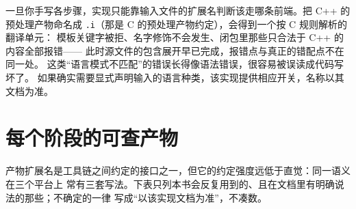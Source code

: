 \documentclass[12pt,a4paper,fontset=fandol]{ctexbook}
\newcommand{\Lang}[1]{\textsf{#1}}
\newcommand{\CL}{\Lang{C}}
\newcommand{\CPP}{\Lang{C++}}
\newcommand{\Sect}[1]{\texttt{.#1}}
\begin{document}
\begin{warning}[title={分步之后，“源文件名”这个信息就丢了}]
一旦你手写各步骤，实现只能靠输入文件的扩展名判断该走哪条前端。把 \CPP{} 的预处理产物命名成
\Sect{i}（那是 \CL{} 的预处理产物约定），会得到一个按 \CL{} 规则解析的翻译单元：
模板关键字被拒、名字修饰不会发生、闭包里那些只合法于 \CPP{} 的内容全部报错——
此时源文件的包含展开早已完成，报错点与真正的错配点不在同一处。
这类“语言模式不匹配”的错误长得像语法错误，很容易被误读成代码写坏了。
如果确实需要显式声明输入的语言种类，该实现提供相应开关，名称以其文档为准。
\end{warning}

\section{每个阶段的可查产物}\label{sec:cl01-products}

产物扩展名是工具链之间约定的接口之一，但它的约定强度远低于直觉：同一语义在三个平台上
常有三套写法。下表只列本书会反复用到的、且在文档里有明确说法的那些；不确定的一律
写成“以该实现文档为准”，不凑数。
\end{document}
